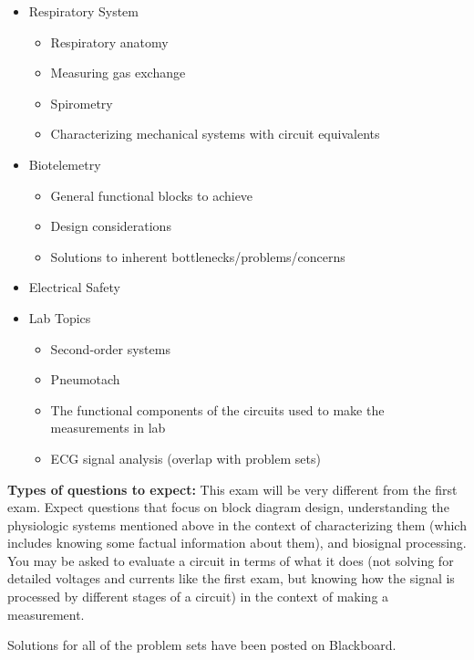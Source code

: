\documentclass[11pt]{article}
\begin{document}
\begin{itemize}
\begin{itemize}
\end{itemize}
\item Respiratory System
    \begin{itemize}
        \item Respiratory anatomy
        \item Measuring gas exchange
        \item Spirometry
        \item Characterizing mechanical systems with circuit equivalents
    \end{itemize}
\item Biotelemetry
    \begin{itemize}
        \item General functional blocks to achieve
        \item Design considerations
        \item Solutions to inherent bottlenecks/problems/concerns
    \end{itemize}
\item Electrical Safety
\item Lab Topics
\begin{itemize}
    \item Second-order systems
    \item Pneumotach
    \item The functional components of the circuits used to make the measurements in lab
    \item ECG signal analysis (overlap with problem sets)
\end{itemize}
\end{itemize}

{\bf Types of questions to expect:}  This exam will be very different from the
first exam.  Expect questions that focus on block diagram design, understanding
the physiologic systems mentioned above in the context of characterizing them
(which includes knowing some factual information about them), and biosignal
processing.  You may be asked to evaluate a circuit in terms of what it does
(not solving for detailed voltages and currents like the first exam, but knowing how the signal is processed by different stages of a circuit) in the context of making a measurement.  

Solutions for all of the problem sets have been posted on Blackboard.
\end{document}
